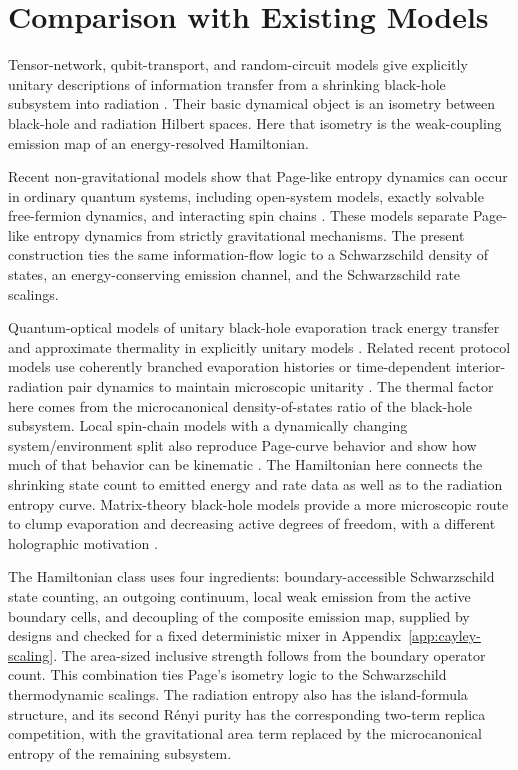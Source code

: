 \documentclass[12pt]{article}
\begin{document}
\section{Comparison with Existing Models}
\label{sec:comparison}

Tensor-network, qubit-transport, and random-circuit models give explicitly
unitary descriptions of information transfer from a shrinking black-hole
subsystem into radiation
\cite{LeutheusserVanRaamsdonk2017,Avery2013,OsugaPage2018,
PiroliSunderhaufQi2020,HottaNambuYamaguchi2018}.  Their basic dynamical object
is an isometry between black-hole and radiation Hilbert spaces.  Here that
isometry is the weak-coupling emission map of an energy-resolved
Hamiltonian.

Recent non-gravitational models show that Page-like entropy dynamics can occur
in ordinary quantum systems, including open-system models, exactly solvable
free-fermion dynamics, and interacting spin chains
\cite{Glatthard2024,Glatthard2025,Kehrein2024,RayDharKulkarni2025}.  These
models separate Page-like entropy dynamics from strictly gravitational
mechanisms.  The present construction ties the same information-flow logic to
a Schwarzschild density of states, an energy-conserving emission channel,
and the Schwarzschild rate scalings.

Quantum-optical models of unitary black-hole evaporation track energy transfer
and approximate thermality in explicitly unitary models
\cite{Alsing2025,Alsing2026}.  Related recent protocol models use
coherently branched evaporation histories or time-dependent interior-radiation
pair dynamics to maintain microscopic unitarity
\cite{AkilGiannelliModestoDahlstenChiribellaBrukner2025,Abutaleb2026}.  The
thermal factor here comes from the microcanonical density-of-states ratio of
the black-hole subsystem.
Local spin-chain models with a dynamically changing system/environment split
also reproduce Page-curve behavior and show how much of that behavior can be
kinematic \cite{JonesAltaieVarcoe2026}.  The Hamiltonian here connects the
shrinking state count to emitted energy and rate data as well as to the
radiation entropy curve.
Matrix-theory black-hole models provide a more microscopic route to clump
evaporation and decreasing active degrees of freedom, with a different
holographic motivation
\cite{BanksFischlerKlebanovSusskind1998,BerkowitzHanadaMaltz2016}.

The Hamiltonian class uses four ingredients: boundary-accessible Schwarzschild
state counting, an outgoing continuum, local weak emission from the active
boundary cells, and decoupling of the composite emission map, supplied by
designs and checked for a fixed deterministic mixer in
Appendix~\ref{app:cayley-scaling}.
The area-sized inclusive strength follows from the boundary operator count.
This combination ties Page's isometry logic to the Schwarzschild thermodynamic
scalings.  The radiation entropy also has the island-formula structure, and
its second R\'enyi purity has the corresponding two-term replica competition,
with the gravitational area term replaced by the microcanonical entropy of the
remaining subsystem.
\end{document}
